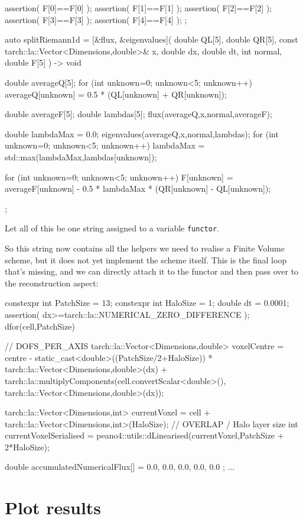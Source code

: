 \begin{code}
{  assertion( F[0]==F[0] );
  assertion( F[1]==F[1] );
  assertion( F[2]==F[2] );
  assertion( F[3]==F[3] );
  assertion( F[4]==F[4] );
};

auto splitRiemann1d = [&flux, &eigenvalues](
  double QL[5], double QR[5], const tarch::la::Vector<Dimensions,double>& x,
  double dx, double dt, int normal, double F[5]
) -> void { double averageQ[5]; 
  for (int unknown=0; unknown<5; unknown++) {
    averageQ[unknown] = 0.5 * (QL[unknown] + QR[unknown]);    
  }
    
  double averageF[5];
  double lambdas[5];
  flux(averageQ,x,normal,averageF);
  
  double lambdaMax = 0.0;
  eigenvalues(averageQ,x,normal,lambdas);
  for (int unknown=0; unknown<5; unknown++) {
    lambdaMax = std::max(lambdaMax,lambdas[unknown]);
  }
  
  for (int unknown=0; unknown<5; unknown++) {
    F[unknown] = averageF[unknown] - 0.5 * lambdaMax * (QR[unknown] - QL[unknown]);
  }
};  
\end{code}

\noindent
Let all of this be one string assigned to a variable \texttt{functor}.


So this string now contains all the helpers we need to realise a Finite Volume
scheme, but it does not yet implement the scheme itself.
This is the final loop that's missing, and we can directly attach it to the
functor and then pass over to the reconstruction aspect:

\begin{code}
  constexpr int PatchSize = 13;
  constexpr int HaloSize  = 1;    
  double dt = 0.0001;
  assertion( dx>=tarch::la::NUMERICAL_ZERO_DIFFERENCE );
  dfor(cell,PatchSize) { // DOFS_PER_AXIS
    tarch::la::Vector<Dimensions,double> voxelCentre = centre 
      - static_cast<double>((PatchSize/2+HaloSize)) * tarch::la::Vector<Dimensions,double>(dx) 
      + tarch::la::multiplyComponents(cell.convertScalar<double>(), tarch::la::Vector<Dimensions,double>(dx));
    
    tarch::la::Vector<Dimensions,int> currentVoxel = cell + tarch::la::Vector<Dimensions,int>(HaloSize); // OVERLAP / Halo layer size
    int currentVoxelSerialised = peano4::utils::dLinearised(currentVoxel,PatchSize + 2*HaloSize);
    
    double accumulatedNumericalFlux[] = { 0.0, 0.0, 0.0, 0.0, 0.0 };
  ...
  }
\end{code}


\section{Plot results}

